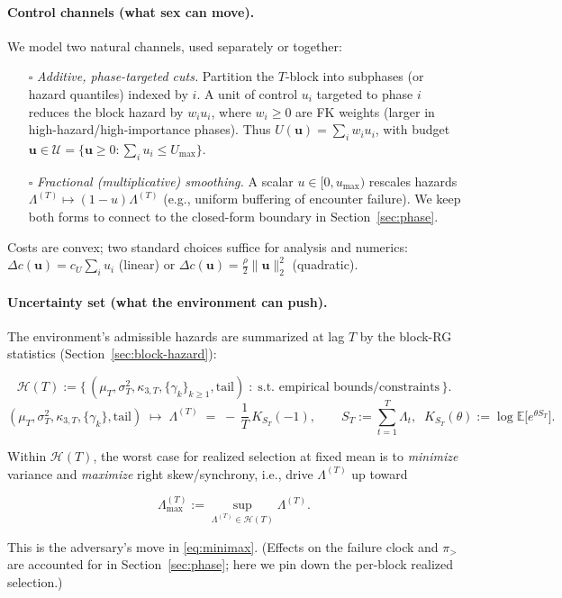 \documentclass[11pt]{article}
\theoremstyle{upright}
\newcommand{\E}{\mathbb{E}}
\newcommand{\hazT}[1]{\Lambda^{(#1)}}          %
\begin{document}
\paragraph{Control channels (what sex can move).}
We model two natural channels, used separately or together:
\begin{enumerate}[label=(C\arabic*)]
\item[$\square$] \emph{Additive, phase-targeted cuts.} Partition the $T$-block into subphases (or hazard quantiles) indexed by $i$. A unit of control $u_i$ targeted to phase $i$ reduces the block hazard by $w_i u_i$, where $w_i\ge 0$ are FK weights (larger in high-hazard/high-importance phases). Thus
$U(\mathbf u)=\sum_i w_i u_i$, with budget $\mathbf u\in\mathcal U=\{\mathbf u\ge 0:\sum_i u_i\le U_{\max}\}$.
\item[$\square$] \emph{Fractional (multiplicative) smoothing.} A scalar $u\in[0,u_{\max})$ rescales hazards $\hazT{T}\mapsto (1-u)\hazT{T}$ (e.g., uniform buffering of encounter failure). We keep both forms to connect to the closed-form boundary in Section~\ref{sec:phase}.
\end{enumerate}
Costs are convex; two standard choices suffice for analysis and numerics: $\Delta c(\mathbf u)=c_U\sum_i u_i$ (linear) or $\Delta c(\mathbf u)=\frac{\rho}{2}\|\mathbf u\|_2^2$ (quadratic).

\paragraph{Uncertainty set (what the environment can push).}
The environment’s admissible hazards are summarized at lag $T$ by the block-RG statistics (Section~\ref{sec:block-hazard}):

\[
\mathcal H(T)
:= \Big\{\,(\mu_T,\sigma_T^2,\kappa_{3,T},\{\gamma_k\}_{k\ge 1},\text{tail}) \;:\;
\text{s.t. empirical bounds/constraints}\,\Big\}.
\]
\[
(\mu_T,\sigma_T^2,\kappa_{3,T},\{\gamma_k\},\text{tail})
\;\longmapsto\;
\hazT{T} \;=\; -\,\frac{1}{T}\,K_{S_T}(-1),
\qquad
S_T:=\sum_{t=1}^{T}\Lambda_t,\;\; K_{S_T}(\theta):=\log \E\!\big[e^{\theta S_T}\big].
\]

Within $\mathcal H(T)$, the worst case for realized selection at fixed mean is to \emph{minimize} variance and \emph{maximize} right skew/synchrony, i.e., drive $\hazT{T}$ up toward

$$
\Lambda_{\max}^{(T)}:=\sup_{\hazT{T}\in\mathcal H(T)}\hazT{T}.
$$

This is the adversary’s move in \eqref{eq:minimax}. (Effects on the failure clock and $\pi_{>}$ are accounted for in Section~\ref{sec:phase}; here we pin down the per-block realized selection.)
\end{document}
